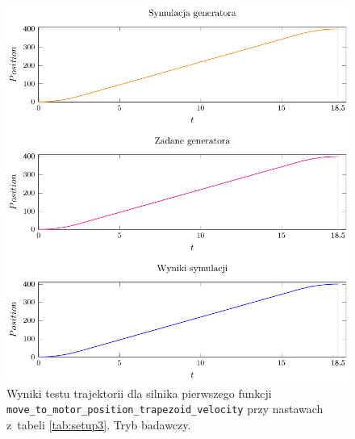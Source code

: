 \documentclass[a4paper, 12pt]{article}
\begin{document}
	\begin{figure}[H]
		\centering
		\includegraphics[scale=1.1]{raport_graphs/simpMPVR.pdf}
		\caption{Wyniki testu trajektorii dla silnika pierwszego funkcji \texttt{move\_to\_motor\_position\_trapezoid\_velocity} przy nastawach z~tabeli \ref{tab:setup3}. Tryb badawczy.}
		\label{fig:simpMPVR}
	\end{figure}
	
\end{document}
